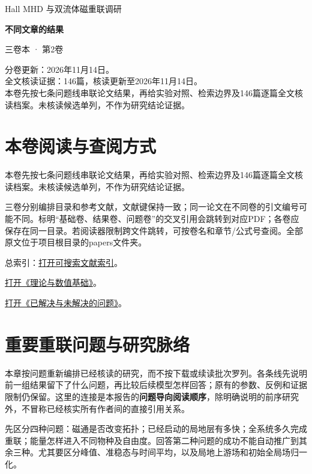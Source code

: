\documentclass[UTF8,a4paper,11pt,openany,fontset=fandol]{ctexbook}
\begin{document}
\frontmatter\begin{titlepage}\vspace*{22mm}
{\sffamily\Large Hall MHD 与双流体磁重联调研\par}\vspace{14mm}
{\sffamily\Huge\bfseries\color{ink}不同文章的结果\par}\vspace{10mm}
{\sffamily\large 三卷本 · 第2卷\par}\vfill
分卷更新：2026年11月14日。\\[5pt]
全文核读证据：146篇，核读更新至2026年11月14日。\\[5pt]
本卷先按七条问题线串联论文结果，再给实验对照、检索边界及146篇逐篇全文核读档案。未核读候选单列，不作为研究结论证据。
\end{titlepage}\chapter*{本卷阅读与查阅方式}
本卷先按七条问题线串联论文结果，再给实验对照、检索边界及146篇逐篇全文核读档案。未核读候选单列，不作为研究结论证据。

三卷分别编排目录和参考文献，文献键保持一致；同一论文在不同卷的引文编号可能不同。标明“基础卷、结果卷、问题卷”的交叉引用会跳转到对应PDF；各卷应保存在同一目录。若阅读器限制跨文件跳转，可按卷名和章节/公式号查阅。全部原文位于项目根目录的papers文件夹。

总索引：\href{run:../paper_index.html}{打开可搜索文献索引}。
\par\href{run:01_theory_numerics.pdf}{打开《理论与数值基础》}。
\par\href{run:03_solved_open.pdf}{打开《已解决与未解决的问题》}。
\tableofcontents\mainmatter
\chapter{重要重联问题与研究脉络}\label{ch:findings}
\label{sec:remaining-findings}
本章按问题重新编排已经核读的研究，而不按下载或续读批次罗列。各条线先说明前一组结果留下了什么问题，再比较后续模型怎样回答；原有的参数、反例和证据限制仍保留。这里的连接是本报告的\textbf{问题导向阅读顺序}，除明确说明的前序研究外，不冒称已经核实所有作者间的直接引用关系。

先区分四种问题：磁通是否改变拓扑；已经启动的局地层有多快；全系统多久完成重联；能量怎样进入不同物种及自由度。回答第二种问题的成功不能自动推广到其余三种。尤其要区分峰值、准稳态与时间平均，以及局地上游场和初始全局场归一化。
\end{document}
